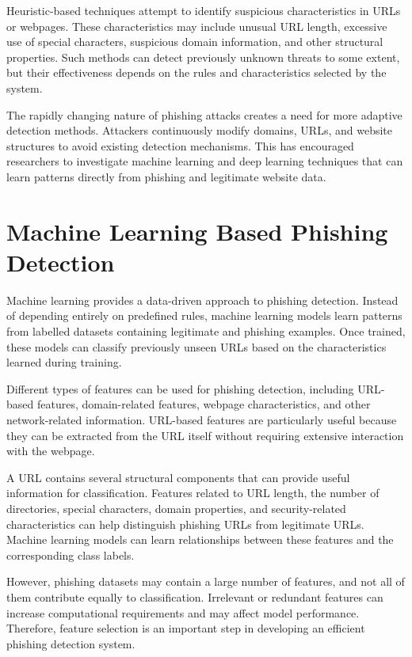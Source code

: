 \documentclass[12pt,a4paper]{report}
\begin{document}
Heuristic-based techniques attempt to identify suspicious characteristics in URLs or webpages. These characteristics may include unusual URL length, excessive use of special characters, suspicious domain information, and other structural properties. Such methods can detect previously unknown threats to some extent, but their effectiveness depends on the rules and characteristics selected by the system.

The rapidly changing nature of phishing attacks creates a need for more adaptive detection methods. Attackers continuously modify domains, URLs, and website structures to avoid existing detection mechanisms. This has encouraged researchers to investigate machine learning and deep learning techniques that can learn patterns directly from phishing and legitimate website data.

\section{Machine Learning Based Phishing Detection}

Machine learning provides a data-driven approach to phishing detection. Instead of depending entirely on predefined rules, machine learning models learn patterns from labelled datasets containing legitimate and phishing examples. Once trained, these models can classify previously unseen URLs based on the characteristics learned during training.

Different types of features can be used for phishing detection, including URL-based features, domain-related features, webpage characteristics, and other network-related information. URL-based features are particularly useful because they can be extracted from the URL itself without requiring extensive interaction with the webpage.

A URL contains several structural components that can provide useful information for classification. Features related to URL length, the number of directories, special characters, domain properties, and security-related characteristics can help distinguish phishing URLs from legitimate URLs. Machine learning models can learn relationships between these features and the corresponding class labels.

However, phishing datasets may contain a large number of features, and not all of them contribute equally to classification. Irrelevant or redundant features can increase computational requirements and may affect model performance. Therefore, feature selection is an important step in developing an efficient phishing detection system.
\end{document}
